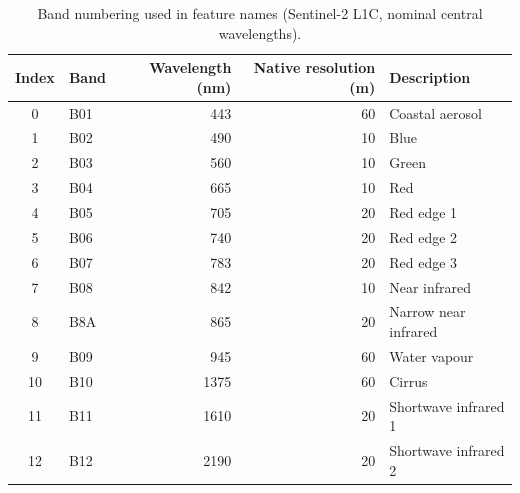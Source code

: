 \documentclass[draft,ea]{agutexSI2019}
\begin{document}
\begin{table}
\caption{Band numbering used in feature names (Sentinel-2 L1C, nominal central wavelengths).}
\centering
\begin{tabular}{c l r r l}
\hline
Index & Band & Wavelength (nm) & Native resolution (m) & Description \\
\hline
0 & B01 & 443 & 60 & Coastal aerosol \\
1 & B02 & 490 & 10 & Blue \\
2 & B03 & 560 & 10 & Green \\
3 & B04 & 665 & 10 & Red \\
4 & B05 & 705 & 20 & Red edge 1 \\
5 & B06 & 740 & 20 & Red edge 2 \\
6 & B07 & 783 & 20 & Red edge 3 \\
7 & B08 & 842 & 10 & Near infrared \\
8 & B8A & 865 & 20 & Narrow near infrared \\
9 & B09 & 945 & 60 & Water vapour \\
10 & B10 & 1375 & 60 & Cirrus \\
11 & B11 & 1610 & 20 & Shortwave infrared 1 \\
12 & B12 & 2190 & 20 & Shortwave infrared 2 \\
\hline
\end{tabular}
\end{table}
\end{document}
